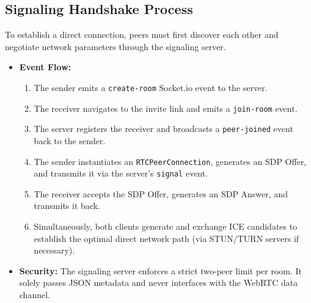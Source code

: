 \documentclass[12pt, a4paper]{article}
\begin{document}
\subsection{Signaling Handshake Process}
To establish a direct connection, peers must first discover each other and negotiate network parameters through the signaling server.
\begin{itemize}
    \item \textbf{Event Flow:}
    \begin{enumerate}
        \item The sender emits a \texttt{create-room} Socket.io event to the server.
        \item The receiver navigates to the invite link and emits a \texttt{join-room} event.
        \item The server registers the receiver and broadcasts a \texttt{peer-joined} event back to the sender.
        \item The sender instantiates an \texttt{RTCPeerConnection}, generates an SDP Offer, and transmits it via the server's \texttt{signal} event.
        \item The receiver accepts the SDP Offer, generates an SDP Answer, and transmits it back.
        \item Simultaneously, both clients generate and exchange ICE candidates to establish the optimal direct network path (via STUN/TURN servers if necessary).
    \end{enumerate}
    \item \textbf{Security:} The signaling server enforces a strict two-peer limit per room. It solely passes JSON metadata and never interfaces with the WebRTC data channel.
\end{itemize}
\end{document}
